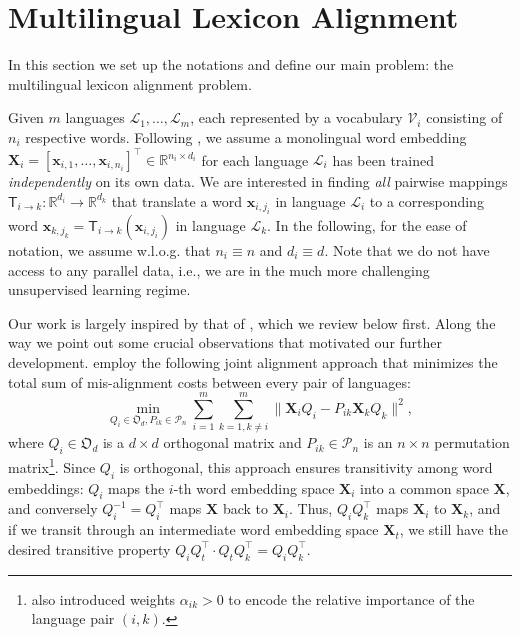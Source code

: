 \documentclass{article}
\newcommand{\RR}{\mathds{R}}
\newcommand{\OO}{\mathfrak{O}}
\newcommand{\PP}{\mathcal{P}}
\newcommand{\Lc}{\mathcal{L}}
\newcommand{\Vc}{\mathcal{V}}
\newcommand{\xv}{\mathbf{x}}
\newcommand{\Tsf}{\mathsf{T}}
\newcommand{\Xv}{\mathbf{X}}
\begin{document}
  \section{Multilingual Lexicon Alignment}
\label{sec:bg}
In this section we set up the notations and define our main problem: the multilingual lexicon alignment problem.

Given $m$ languages $\Lc_1, \ldots, \Lc_m$, each represented by a vocabulary $\Vc_i$ consisting of $n_i$ respective words. Following \citet{MikolovLS13}, we assume a monolingual word embedding $\Xv_i = [\xv_{i,1}, \ldots, \xv_{i,n_i}]^\top \in \RR^{n_i \times d_i}$ for each language $\Lc_i$ has been trained \emph{independently} on its own data. We are interested in finding \emph{all} pairwise mappings $\Tsf_{i \to k}: \RR^{d_i} \to \RR^{d_k}$ that translate a word $\xv_{i, j_i}$ in language $\Lc_i$ to a corresponding word $\xv_{k, j_k} = \Tsf_{i \to k}(\xv_{i, j_i})$ in language $\Lc_k$. In the following, for the ease of notation, we assume w.l.o.g. that $n_i \equiv n$ and $d_i \equiv d$. Note that we do not have access to any parallel data, i.e., we are in the much more challenging unsupervised learning regime.

Our work is largely inspired by that of \citet{AlauxGCJ19}, which we review below first. Along the way we point out some crucial observations that motivated our further development. \citet{AlauxGCJ19} employ the following joint alignment approach that  minimizes the total sum of mis-alignment costs between every pair of languages: 
\begin{equation}
\label{eq:UMH}
    \!\min_{Q_i\in \OO_d, P_{ik}\in \PP_n} \sum_{i=1}^m \sum_{k=1, k\ne i}^m  \| \Xv_iQ_i - P_{ik}\Xv_k Q_k \|^2, \!
\end{equation}
where $Q_i \in \OO_d$ is a $d\times d$ orthogonal matrix and $P_{ik} \in \PP_n$ is an $n\times n$ permutation matrix\footnote{\citet{AlauxGCJ19} also introduced weights  $\alpha_{ik} > 0$ to encode the relative importance of the language pair $(i,k)$.}. Since $Q_i$ is orthogonal, this approach ensures transitivity among word embeddings: $Q_i$ maps the $i$-th word embedding space $\Xv_i$ into a common space $\Xv$, and conversely $Q_i^{-1} = Q_i^\top$ maps $\Xv$ back to $\Xv_i$. Thus, $Q_iQ_k^\top$ maps $\Xv_i$ to $\Xv_k$, and if we transit through an intermediate word embedding space $\Xv_t$, we still have the desired transitive property $Q_i Q_t^\top \cdot Q_t Q_k^\top = Q_i Q_k^\top$.
\end{document}
